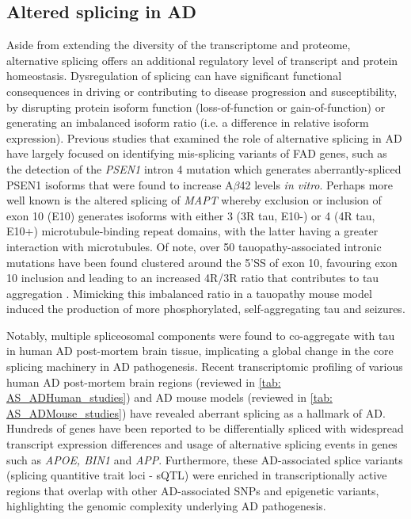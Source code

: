 \newpage
\subsection{Altered splicing in AD}\label{intro:AD_alteredsplicing}
Aside from extending the diversity of the transcriptome and proteome, alternative splicing offers an additional regulatory level of transcript and protein homeostasis. Dysregulation of splicing can have significant functional consequences in driving or contributing to disease progression and susceptibility, by disrupting protein isoform function (loss-of-function or gain-of-function) or generating an imbalanced isoform ratio (i.e. a difference in relative isoform expression). Previous studies that examined the role of alternative splicing in AD have largely focused on identifying mis-splicing variants of FAD genes, such as the detection of the \textit{PSEN1} intron 4 mutation which generates aberrantly-spliced PSEN1 isoforms that were found to increase A$\beta$42 levels \textit{in vitro}\cite{DeJonghe1999}. Perhaps more well known is the altered splicing of \textit{MAPT} whereby exclusion or inclusion of exon 10 (E10) generates isoforms with either 3 (3R tau, E10-) or 4 (4R tau, E10+) microtubule-binding repeat domains, with the latter having a greater interaction with microtubules. Of note, over 50 tauopathy-associated intronic mutations have been found clustered around the 5'SS of exon 10, favouring exon 10 inclusion \cite{DSouza1999, Ghetti2015} and leading to an increased 4R/3R ratio that contributes to tau aggregation \cite{Adams2010}. Mimicking this imbalanced ratio in a tauopathy mouse model induced the production of more phosphorylated, self-aggregating tau and seizures\cite{Schoch2016}.  

Notably, multiple spliceosomal components were found to co-aggregate with tau in human AD post-mortem brain tissue\cite{Bai2013}, implicating a global change in the core splicing machinery in AD pathogenesis. Recent transcriptomic profiling of various human AD post-mortem brain regions (reviewed in \cref{tab: AS_ADHuman_studies}) and AD mouse models (reviewed in \cref{tab: AS_ADMouse_studies}) have revealed aberrant splicing as a hallmark of AD. Hundreds of genes have been reported to be differentially spliced with widespread transcript expression differences and usage of alternative splicing events in genes such as \textit{APOE, BIN1} and \textit{APP}\cite{Marques-Coelho2021, Raj2018}. Furthermore, these AD-associated splice variants (splicing quantitive trait loci - sQTL) were enriched in transcriptionally active regions that overlap with other AD-associated SNPs and epigenetic variants, highlighting the genomic complexity underlying AD pathogenesis.  


